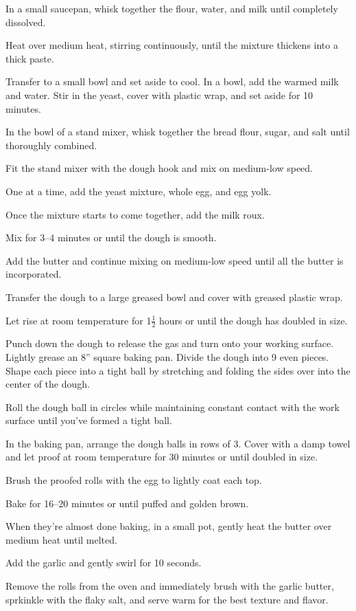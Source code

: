 \begin{method}
        In a small saucepan, whisk together the flour, water, and milk until completely dissolved.\par
        Heat over medium heat, stirring continuously, until the mixture thickens into a thick paste.\par
        Transfer to a small bowl and set aside to cool.
        In a bowl, add the warmed milk and water. Stir in the yeast, cover with plastic wrap, and set aside for 10 minutes.\par
        In the bowl of a stand mixer, whisk together the bread flour, sugar, and salt until thoroughly combined.\par
        Fit the stand mixer with the dough hook and mix on medium-low speed.\par
        One at a time, add the yeast mixture, whole egg, and egg yolk.\par
        Once the mixture starts to come together, add the milk roux.\par
        Mix for 3--4 minutes or until the dough is smooth.\par
        Add the butter and continue mixing on medium-low speed until all the butter is incorporated.\par
        Transfer the dough to a large greased bowl and cover with greased plastic wrap.\par
        Let rise at room temperature for 1$\frac{1}{2}$ hours or until the dough has doubled in size.\par
        Punch down the dough to release the gas and turn onto your working surface.
        Lightly grease an 8'' square baking pan. Divide the dough into 9 even pieces. Shape each piece into a tight ball by stretching and folding the sides over into the center of the dough.\par
        Roll the dough ball in circles while maintaining constant contact with the work surface until you've formed a tight ball.\par
        In the baking pan, arrange the dough balls in rows of 3. Cover with a damp towel and let proof at room temperature for 30 minutes or until doubled in size.\par
        Brush the proofed rolls with the egg to lightly coat each top.\par
        Bake for 16--20 minutes or until puffed and golden brown.\par
        When they're almost done baking, in a small pot, gently heat the butter over medium heat until melted.\par
        Add the garlic and gently swirl for 10 seconds.\par
        Remove the rolls from the oven and immediately brush with the garlic butter, sprkinkle with the flaky salt, and serve warm for the best texture and flavor.
\end{method}
